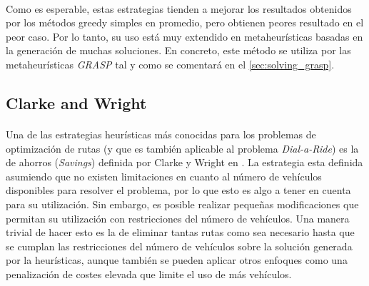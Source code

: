 \documentclass{subfiles}
\begin{document}
          \paragraph{}
          Como es esperable, estas estrategias tienden a mejorar los resultados obtenidos por los métodos greedy simples en promedio, pero obtienen peores resultado en el peor caso. Por lo tanto, su uso está muy extendido en metaheurísticas basadas en la generación de muchas soluciones. En concreto, este método se utiliza por las metaheurísticas \emph{GRASP} tal y como se comentará en el \cref{sec:solving_grasp}.

      \subsection{Clarke and Wright}
      \label{sec:solving_clarke_and_wright}

        \paragraph{}
        Una de las estrategias heurísticas más conocidas para los problemas de optimización de rutas (y que es también aplicable al problema \emph{Dial-a-Ride}) es la de ahorros (\emph{Savings}) definida por Clarke y Wright en \cite{clarke1964scheduling}. La estrategia esta definida asumiendo que no existen limitaciones en cuanto al número de vehículos disponibles para resolver el problema, por lo que esto es algo a tener en cuenta para su utilización. Sin embargo, es posible realizar pequeñas modificaciones que permitan su utilización con restricciones del número de vehículos. Una manera trivial de hacer esto es la de eliminar tantas rutas como sea necesario hasta que se cumplan las restricciones del número de vehículos sobre la solución generada por la heurísticas, aunque también se pueden aplicar otros enfoques como una penalización de costes elevada que limite el uso de más vehículos.
\end{document}
